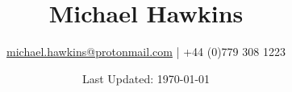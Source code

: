 \documentclass[a4paper]{article}
\title{Michael Hawkins}
\author{\href{mailto:michael.hawkins@protonmail.com}{michael.hawkins@protonmail.com} | +44 (0)779 308 1223}
\date{Last Updated: \today}
\begin{document}
\maketitle
\renewcommand{\contentsname}{}
\tableofcontents





\end{document}
